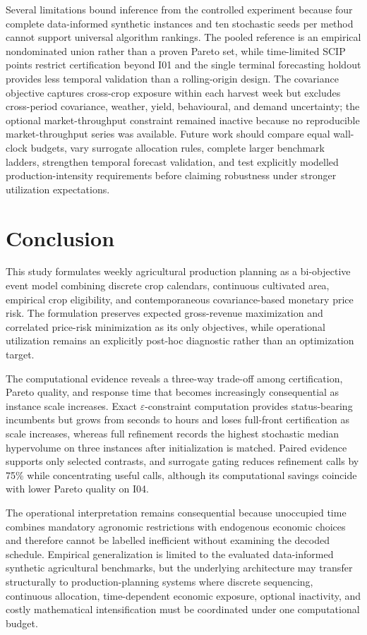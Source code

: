 \documentclass[]{interact}
\begin{document}
Several limitations bound inference from the controlled experiment because four complete data-informed synthetic instances and ten stochastic seeds per method cannot support universal algorithm rankings. The pooled reference is an empirical nondominated union rather than a proven Pareto set, while time-limited SCIP points restrict certification beyond I01 and the single terminal forecasting holdout provides less temporal validation than a rolling-origin design. The covariance objective captures cross-crop exposure within each harvest week but excludes cross-period covariance, weather, yield, behavioural, and demand uncertainty; the optional market-throughput constraint remained inactive because no reproducible market-throughput series was available. Future work should compare equal wall-clock budgets, vary surrogate allocation rules, complete larger benchmark ladders, strengthen temporal forecast validation, and test explicitly modelled production-intensity requirements before claiming robustness under stronger utilization expectations.

\section{Conclusion}

This study formulates weekly agricultural production planning as a bi-objective event model combining discrete crop calendars, continuous cultivated area, empirical crop eligibility, and contemporaneous covariance-based monetary price risk. The formulation preserves expected gross-revenue maximization and correlated price-risk minimization as its only objectives, while operational utilization remains an explicitly post-hoc diagnostic rather than an optimization target.

The computational evidence reveals a three-way trade-off among certification, Pareto quality, and response time that becomes increasingly consequential as instance scale increases. Exact $\varepsilon$-constraint computation provides status-bearing incumbents but grows from seconds to hours and loses full-front certification as scale increases, whereas full refinement records the highest stochastic median hypervolume on three instances after initialization is matched. Paired evidence supports only selected contrasts, and surrogate gating reduces refinement calls by 75\% while concentrating useful calls, although its computational savings coincide with lower Pareto quality on I04.

The operational interpretation remains consequential because unoccupied time combines mandatory agronomic restrictions with endogenous economic choices and therefore cannot be labelled inefficient without examining the decoded schedule. Empirical generalization is limited to the evaluated data-informed synthetic agricultural benchmarks, but the underlying architecture may transfer structurally to production-planning systems where discrete sequencing, continuous allocation, time-dependent economic exposure, optional inactivity, and costly mathematical intensification must be coordinated under one computational budget.
\end{document}
